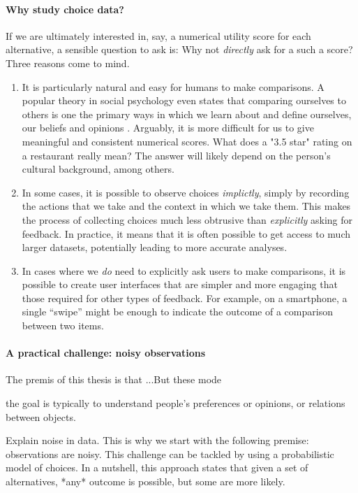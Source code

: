 \paragraph{Why study choice data?}
If we are ultimately interested in, say, a numerical utility score for each alternative, a sensible question to ask is:
Why not \emph{directly} ask for a such a score?
Three reasons come to mind.
\begin{enumerate}
\item It is particularly natural and easy for humans to make comparisons.
A popular theory in social psychology even states that comparing ourselves to others is one the primary ways in which we learn about and define ourselves, our beliefs and opinions \citep{festinger1954theory}.
Arguably, it is more difficult for us to give meaningful and consistent numerical scores.
What does a "3.5 star" rating on a restaurant really mean? The answer will likely depend on the person's cultural background, among others.

\item In some cases, it is possible to observe choices \emph{implictly}, simply by recording the actions that we take and the context in which we take them.
This makes the process of collecting choices much less obtrusive than \emph{explicitly} asking for feedback.
In practice, it means that it is often possible to get access to much larger datasets, potentially leading to more accurate analyses.

\item In cases where we \emph{do} need to explicitly ask users to make comparisons, it is possible to create user interfaces that are simpler and more engaging that those required for other types of feedback.
For example, on a smartphone, a single ``swipe'' might be enough to indicate the outcome of a comparison between two items.
\end{enumerate}

\paragraph{A practical challenge: noisy observations}
The premis of this thesis is that ...But these mode

the goal is typically to understand people's preferences or opinions, or relations between objects.

Explain noise in data.
This is why we start with the following premise: observations are noisy.
This challenge can be tackled by using a probabilistic model of choices. In a nutshell, this approach states that given a set of alternatives, *any* outcome is possible, but some are more likely.

